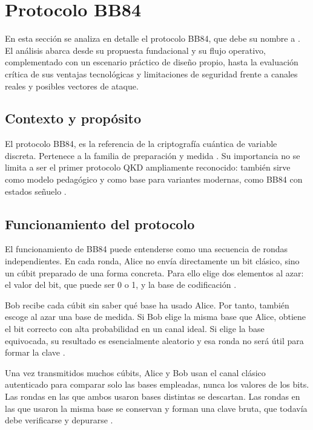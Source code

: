 \section{Protocolo BB84}

En esta sección se analiza en detalle el protocolo BB84, que debe su nombre a \cite{bennett1984}. El análisis abarca desde su propuesta fundacional y su flujo operativo, complementado con un escenario práctico de diseño propio, hasta la evaluación crítica de sus ventajas tecnológicas y limitaciones de seguridad frente a canales reales y posibles vectores de ataque.

\subsection{Contexto y propósito}
El protocolo BB84, es la referencia de la criptografía cuántica de variable discreta. Pertenece a la familia de preparación y medida \citep{gisin2002,scarani2009}. Su importancia no se limita a ser el primer protocolo QKD ampliamente reconocido: también sirve como modelo pedagógico y como base para variantes modernas, como BB84 con estados señuelo \citep{hwang2003,lo2005,wang2005}.

\subsection{Funcionamiento del protocolo}
El funcionamiento de BB84 puede entenderse como una secuencia de rondas independientes. En cada ronda, Alice no envía directamente un bit clásico, sino un cúbit preparado de una forma concreta. Para ello elige dos elementos al azar: el valor del bit, que puede ser 0 o 1, y la base de codificación \citep{bennett1984,gisin2002}.

Bob recibe cada cúbit sin saber qué base ha usado Alice. Por tanto, también escoge al azar una base de medida. Si Bob elige la misma base que Alice, obtiene el bit correcto con alta probabilidad en un canal ideal. Si elige la base equivocada, su resultado es esencialmente aleatorio y esa ronda no será útil para formar la clave \citep{bennett1984,scarani2009}.

Una vez transmitidos muchos cúbits, Alice y Bob usan el canal clásico autenticado para comparar solo las bases empleadas, nunca los valores de los bits. Las rondas en las que ambos usaron bases distintas se descartan. Las rondas en las que usaron la misma base se conservan y forman una clave bruta, que todavía debe verificarse y depurarse \citep{gisin2002,scarani2009}.

